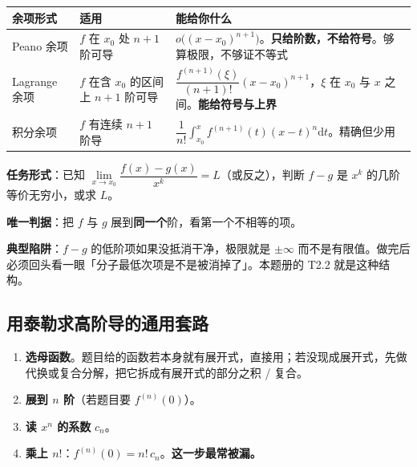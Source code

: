 \documentclass[11pt,a4paper]{ctexart}
\newcommand{\D}{\mathrm{d}}
\begin{document}
\begin{center}
\footnotesize
\renewcommand{\arraystretch}{1.35}
\begin{tabularx}{\textwidth}{@{}l l X@{}}
\toprule
\textbf{余项形式} & \textbf{适用} & \textbf{能给你什么}\\
\midrule
Peano 余项 & $f$ 在 $x_0$ 处 $n+1$ 阶可导 &
$o\big((x-x_0)^{n+1}\big)$。\textbf{只给阶数，不给符号}。够算极限，不够证不等式\\
Lagrange 余项 & $f$ 在含 $x_0$ 的区间上 $n+1$ 阶可导 &
$\dfrac{f^{(n+1)}(\xi)}{(n+1)!}(x-x_0)^{n+1}$，$\xi$ 在 $x_0$ 与 $x$ 之间。\textbf{能给符号与上界}\\
积分余项 & $f$ 有连续 $n+1$ 阶导 &
$\dfrac{1}{n!}\int_{x_0}^{x}f^{(n+1)}(t)(x-t)^{n}\D t$。精确但少用\\
\bottomrule
\end{tabularx}
\end{center}

\begin{methodbox}[「估阶」是真题真正的考点]
\textbf{任务形式}：已知 $\lim\limits_{x\to x_0}\dfrac{f(x)-g(x)}{x^{k}}=L$（或反之），判断 $f-g$ 是 $x^{k}$ 的几阶等价无穷小，或求 $L$。

\textbf{唯一判据}：把 $f$ 与 $g$ 展到\textbf{同一个}阶，看第一个不相等的项。

\textbf{典型陷阱}：$f-g$ 的低阶项如果没抵消干净，极限就是 $\pm\infty$ 而不是有限值。做完后必须回头看一眼「分子最低次项是不是被消掉了」。本题册的 T2.2 就是这种结构。
\end{methodbox}

\subsection{用泰勒求高阶导的通用套路}

\begin{keypoint}
\begin{enumerate}
\item \textbf{选母函数}。题目给的函数若本身就有展开式，直接用；若没现成展开式，先做代换或复合分解，把它拆成有展开式的部分之积 / 复合。
\item \textbf{展到 $n$ 阶}（若题目要 $f^{(n)}(0)$）。
\item \textbf{读 $x^{n}$ 的系数} $c_{n}$。
\item \textbf{乘上 $n!$}：$f^{(n)}(0)=n!\,c_{n}$。\textbf{这一步最常被漏。}
\end{enumerate}
\end{keypoint}
\end{document}
